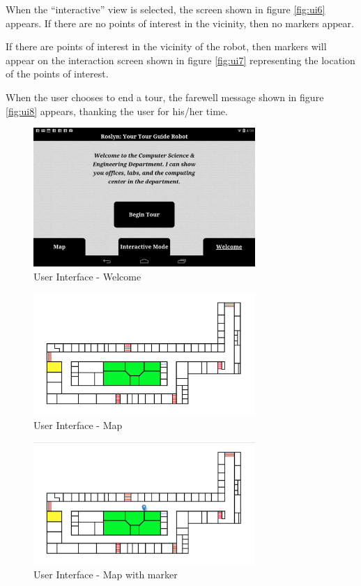 \documentclass[11pt]{report}
\begin{document}
When the “interactive” view is selected, the screen shown in figure \ref{fig:ui6} appears. If there are no points of interest in the vicinity, then no markers appear.

If there are points of interest in the vicinity of the robot, then markers will appear on the interaction screen shown in figure \ref{fig:ui7} representing the location of the points of interest.

When the user chooses to end a tour, the farewell message shown in figure \ref{fig:ui8} appears, thanking the user for his/her time.

\begin{figure}[H]
 \centering
 \includegraphics[width=0.75\textwidth]{ui1.png}
 \caption{User Interface - Welcome}
 \label{fig:ui1}
\end{figure}
\begin{figure}[H]
 \centering
 \includegraphics[width=0.75\textwidth]{ui2.png}
 \caption{User Interface - Map}
 \label{fig:ui2}
\end{figure}
\begin{figure}[H]
 \centering
 \includegraphics[width=0.75\textwidth]{ui3.png}
 \caption{User Interface - Map with marker}
 \label{fig:ui3}
\end{figure}
\end{document}
